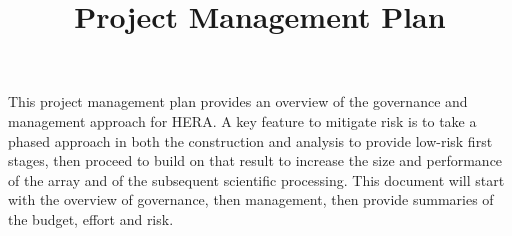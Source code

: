\documentclass[preprint]{aastex}
\begin{document}
\title{Project Management Plan}


This project management plan provides an overview of the governance and management approach for HERA.
A key feature to mitigate risk is to take a phased approach in both the construction and analysis to provide low-risk
first stages, then proceed to build on that result to increase the size and performance of the array and of the subsequent
scientific processing.  This document will start with the overview of governance, then management, then provide
summaries of the budget, effort and risk.
\end{document}
